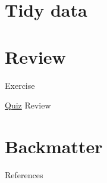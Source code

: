 \documentclass[
  11pt,
  ignorenonframetext,
]{beamer}
\begin{document}
\hypertarget{tidy-data}{%
\section{Tidy data}\label{tidy-data}}

\hypertarget{review}{%
\section{Review}\label{review}}

\begin{frame}{Exercise}
\protect\hypertarget{exercise}{}
\end{frame}

\begin{frame}[fragile]{\protect\hyperlink{pop-quiz}{Quiz} Review}
\protect\hypertarget{quiz-review}{}
\end{frame}

\hypertarget{backmatter}{%
\section{Backmatter}\label{backmatter}}

\begin{frame}{References}
\protect\hypertarget{references}{}
\end{frame}
\end{document}
